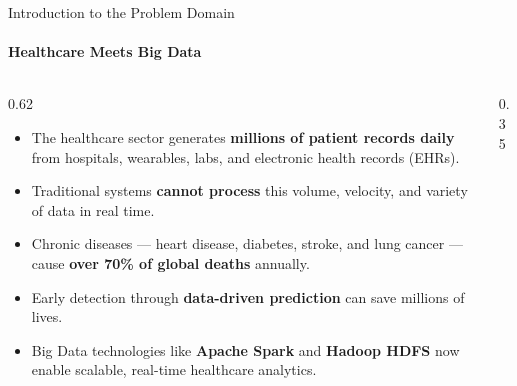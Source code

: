 \documentclass[aspectratio=169, 11pt]{beamer}
\begin{document}
\begin{frame}{Introduction to the Problem Domain}
\framesubtitle{Healthcare Meets Big Data}

\begin{columns}[T]
\begin{column}{0.62\textwidth}
  \begin{itemize}
    \item The healthcare sector generates \textbf{millions of patient records daily} from hospitals, wearables, labs, and electronic health records (EHRs).
    \vspace{0.2cm}
    \item Traditional systems \textbf{cannot process} this volume, velocity, and variety of data in real time.
    \vspace{0.2cm}
    \item Chronic diseases --- heart disease, diabetes, stroke, and lung cancer --- cause \textbf{over 70\% of global deaths} annually.
    \vspace{0.2cm}
    \item Early detection through \textbf{data-driven prediction} can save millions of lives.
    \vspace{0.2cm}
    \item Big Data technologies like \textbf{Apache Spark} and \textbf{Hadoop HDFS} now enable scalable, real-time healthcare analytics.
  \end{itemize}
\end{column}

\begin{column}{0.35\textwidth}
\end{column}
\end{columns}
\end{frame}
\end{document}
